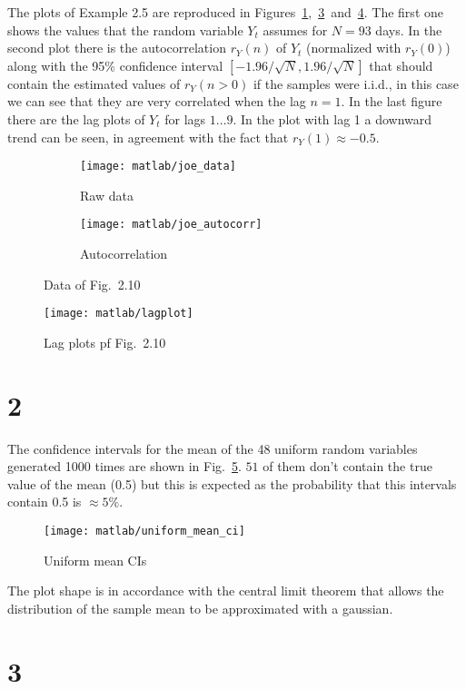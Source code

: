 \documentclass{article}
\begin{document}
The plots of Example 2.5 are reproduced in
Figures~\ref{joe_data},~\ref{joe_autocorr}~and~\ref{joe_lagplot}. The
first one shows the values that the random variable $Y_t$ assumes
for $N = 93$ days. In the second plot there is the autocorrelation
$r_Y(n)$ of $Y_t$ (normalized with $r_Y(0)$) along with the 95\%
confidence interval $[-1.96/\sqrt{N}, 1.96/\sqrt{N}]$ that should
contain the estimated values of $r_Y(n>0)$ if the samples were
i.i.d., in this case we can see that they are very correlated when
the lag $n=1$.  In the last figure there are the lag plots of
$Y_t$ for lags $1\dots9$. In the plot with lag 1 a downward trend
can be seen, in agreement with the fact that $r_Y(1) \approx
-0.5$.
\begin{figure}[htbp]
  \centering
  \begin{subfigure}{.5\textwidth}
    \centering
    \texttt{[image: matlab/joe\_data]}
    \caption{Raw data}
    \label{joe_data}
  \end{subfigure}%
  \begin{subfigure}{.5\textwidth}
    \centering
    \texttt{[image: matlab/joe\_autocorr]}
    \caption{Autocorrelation}
    \label{joe_autocorr}
  \end{subfigure}
  \caption{Data of Fig.~2.10}
\end{figure}
\begin{figure}[htbp]
  \centering
  \texttt{[image: matlab/lagplot]}
  \caption{Lag plots pf Fig.~2.10}
  \label{joe_lagplot}
\end{figure}

\section*{2}
The confidence intervals for the mean of the 48 uniform random
variables generated 1000 times are shown in
Fig.~\ref{uniform_mean_ci}. $51$ of them don't contain the true
value of the mean (0.5) but this is expected as the probability that
this intervals contain 0.5 is $\approx 5\%$.
\begin{figure}[htbp]
  \centering
  \texttt{[image: matlab/uniform\_mean\_ci]}
  \caption{Uniform mean CIs}
  \label{uniform_mean_ci}
\end{figure}
The plot shape is in accordance with the central limit theorem that
allows the distribution of the sample mean to be approximated with a
gaussian.
\section*{3}
\end{document}
